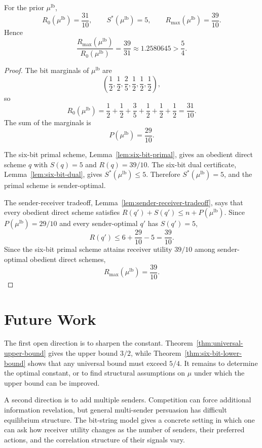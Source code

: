 \documentclass[format=acmsmall, review=false]{acmart}
\begin{document}
\begin{theorem}
\label{thm:six-bit-lower-bound}
For the prior $\mu^{\mathrm{lb}}$,
\[
R_0(\mu^{\mathrm{lb}})=\frac{31}{10},
\qquad
S^*(\mu^{\mathrm{lb}})=5,
\qquad
R_{\max}(\mu^{\mathrm{lb}})=\frac{39}{10}.
\]
Hence
\[
\frac{R_{\max}(\mu^{\mathrm{lb}})}{R_0(\mu^{\mathrm{lb}})}
=
\frac{39}{31}
\approx 1.2580645
>
\frac54.
\]
\end{theorem}

\begin{proof}
The bit marginals of $\mu^{\mathrm{lb}}$ are
\[
\left(\frac12,\frac12,\frac25,\frac12,\frac12,\frac12\right),
\]
so
\[
R_0(\mu^{\mathrm{lb}})
=
\frac12+\frac12+\frac35+\frac12+\frac12+\frac12
=\frac{31}{10}.
\]
The sum of the marginals is
\[
P(\mu^{\mathrm{lb}})=\frac{29}{10}.
\]

The six-bit primal scheme, Lemma~\ref{lem:six-bit-primal}, gives an obedient
direct scheme $q$ with $S(q)=5$ and $R(q)=39/10$. The six-bit dual certificate,
Lemma~\ref{lem:six-bit-dual}, gives $S^*(\mu^{\mathrm{lb}})\leq 5$. Therefore
$S^*(\mu^{\mathrm{lb}})=5$, and the primal scheme is sender-optimal.

The sender-receiver tradeoff, Lemma~\ref{lem:sender-receiver-tradeoff}, says
that every obedient direct scheme satisfies
$R(q')+S(q')\leq n+P(\mu^{\mathrm{lb}})$. Since
$P(\mu^{\mathrm{lb}})=29/10$ and every sender-optimal $q'$ has $S(q')=5$,
\[
R(q')\leq 6+\frac{29}{10}-5=\frac{39}{10}.
\]
Since the six-bit primal scheme attains receiver utility $39/10$ among
sender-optimal obedient direct schemes,
\[
R_{\max}(\mu^{\mathrm{lb}})=\frac{39}{10}.
\]
\end{proof}

\section{Future Work}

The first open direction is to sharpen the constant.
Theorem~\ref{thm:universal-upper-bound} gives the upper bound $3/2$, while
Theorem~\ref{thm:six-bit-lower-bound} shows that any universal bound must
exceed $5/4$. It remains to determine the optimal constant, or to find
structural assumptions on $\mu$ under which the upper bound can be improved.

A second direction is to add multiple senders. Competition can force additional
information revelation, but general multi-sender persuasion has difficult
equilibrium structure. The bit-string model gives a concrete setting in which
one can ask how receiver utility changes as the number of senders, their
preferred actions, and the correlation structure of their signals vary.
\end{document}
